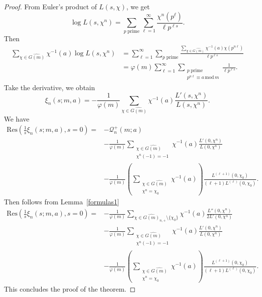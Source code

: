 \documentclass[12pt]{amsart}
\begin{document}
\begin{proof}

From Euler's product of $L(s,\chi)$, we get
\begin{equation*}
\log L(s,\chi^n) = \sum_{p\;\text{prime}} \sum_{\ell=1}^\infty \frac{\chi^n(p^\ell)}{\ell p^{\ell s}}.
\end{equation*}
Then
\begin{align*}
\sum_{\chi \in \widehat{G(m)}} \chi^{-1}(a) \log L(s,\chi^n)
&= \sum_{\ell=1}^\infty \sum_{p\;\text{prime}} \frac{ \sum_{\chi \in \widehat{G(m)}} \chi^{-1}(a) \chi(p^{n\ell}) }{ \ell p^{\ell s} } \\
&= \varphi(m) \sum_{\ell=1}^\infty \sum_{\substack{p\;\text{prime} \\ p^{n\ell} \equiv a\, \mathrm{mod}\, m}} \frac{1}{\ell p^{\ell s}}.
\end{align*}
Take the derivative, we obtain
\begin{equation*}
\xi_n(s; m, a) = -\frac{1}{\varphi(m)} \sum_{\chi \in \widehat{G(m)}} \chi^{-1}(a) \frac{L'(s,\chi^n)}{L(s,\chi^n)}.
\end{equation*}
We have
\begin{equation*}
\begin{split}
\mathrm{Res}\left( \frac{1}{s} \xi_n(s; m, a), s=0 \right)
= &-\mathscr{Q}_n^+(m; a) \\
&- \frac{1}{\varphi(m)} \sum_{\substack{\chi \in \widehat{G(m)} \\ \chi^n(-1) = -1}} \chi^{-1}(a) \frac{L'(0,\chi^n)}{L(0,\chi^n)} \\
&- \frac{1}{\varphi(m)} \left( \sum_{\substack{\chi \in \widehat{G(m)} \\ \chi^n = \chi_0}} \chi^{-1}(a) \right) \frac{L^{(\ell+1)}(0,\chi_0)}{(\ell+1) L^{(\ell)}(0,\chi_0)}.
\end{split}
\end{equation*}
Then follows from Lemma~\ref{formulas1}
\begin{equation*}
\begin{split}
\mathrm{Res}\left( \frac{1}{s} \xi_n(s; m, a), s=0 \right)
= &-\frac{1}{\varphi(m)} \sum_{\chi \in \widehat{G(m)}_{n,+} \setminus \{\chi_0\}} \chi^{-1}(a) \frac{L''(0,\chi^n)}{2 L'(0,\chi^n)} \\
&- \frac{1}{\varphi(m)} \sum_{\substack{\chi \in \widehat{G(m)} \\ \chi^n(-1) = -1}} \chi^{-1}(a) \frac{L'(0,\chi^n)}{L(0,\chi^n)} \\
&- \frac{1}{\varphi(m)} \left( \sum_{\substack{\chi \in \widehat{G(m)} \\ \chi^n = \chi_0}} \chi^{-1}(a) \right) \frac{L^{(\ell+1)}(0,\chi_0)}{(\ell+1) L^{(\ell)}(0,\chi_0)}.
\end{split}
\end{equation*}
This concludes the proof of the theorem.

\end{proof}
\end{document}
